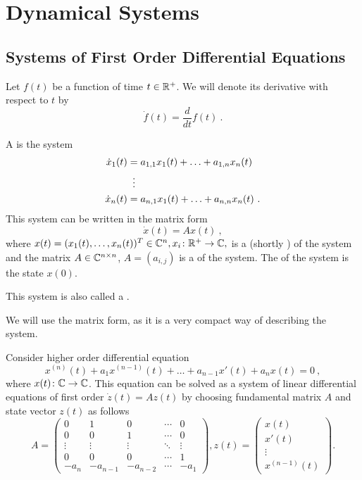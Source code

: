 \chapter{Dynamical Systems}
\label{chap:intr}

\section{Systems of First Order Differential Equations}

\begin{remark}
	Let $f(t)$ be a function of time $t\in\mathbb{R}^+$. We will denote its derivative with respect to $t$ by $$\dot{f}(t)=\frac{d}{dt}f(t)\ .$$
\end{remark}

\begin{definition}
	A  is the system 
	\begin{align*}
		\dot{x}_1(t)&=a_{1,1}x_1(t)+\ldots+a_{1,n}x_n(t) \\
		&\vdotswithin{=} \\
		\dot{x}_n(t)&=a_{n,1}x_1(t)+\ldots+a_{n,n}x_n(t)\ .
	\end{align*}
	This system can be written in the matrix form $$\dot{x}(t)=Ax(t)\ ,$$ where $x(t)=(x_1(t),\ldots,x_n(t))^T \in \mathbb{C}^n, x_i\colon\mathbb{R}^+\to\mathbb{C},$ is a  (shortly ) of the system and the matrix $A\in \mathbb{C}^{n\times n}$, $A=(a_{i,j})$ is a  of the system. The  of the system is the state $x(0)$.

	This system is also called a .
\end{definition}

We will use the matrix form, as it is a very compact way of describing the system.

\begin{example}
	Consider higher order differential equation $$x^{(n)}(t)+a_1x^{(n-1)}(t)+\ldots+a_{n-1}x'(t)+a_nx(t)=0\ ,$$ where $x(t)\colon\mathbb{C}\rightarrow\mathbb{C}$. This equation can be solved as a system of linear differential equations of first order $\dot{z}(t)=Az(t)$ by choosing fundamental matrix $A$ and state vector $z(t)$ as follows
	\begin{equation*}
		A=
		\begin{pmatrix}
			0 & 1 & 0 & \cdots & 0 \\
			0 & 0 & 1 & \cdots & 0 \\
			\vdots & \vdots & \vdots & \ddots & \vdots \\
			0 & 0 & 0 & \cdots & 1 \\
			-a_n & -a_{n-1} & -a_{n-2} & \cdots & -a_1
		\end{pmatrix}
		, z(t)=
		\begin{pmatrix}
			x(t) \\
			x'(t) \\
			\vdots \\
			x^{(n-1)}(t)
		\end{pmatrix}.
	\end{equation*}
\end{example}

